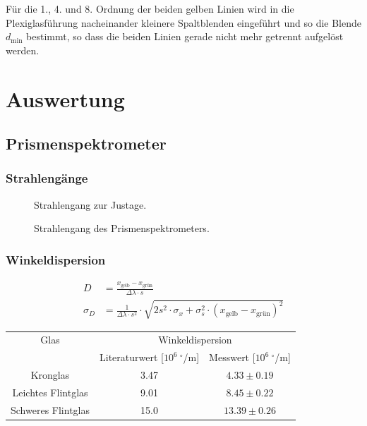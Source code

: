 \documentclass[12pt,a4paper,titlepage,headinclude,bibtotoc]{scrartcl}
\begin{document}
Für die 1., 4. und 8. Ordnung der beiden gelben Linien wird in die Plexiglasführung nacheinander kleinere Spaltblenden eingeführt und so die Blende $d_\text{min}$ bestimmt, so dass die beiden Linien gerade nicht mehr getrennt aufgelöst werden.

\section{Auswertung}
\label{sec:auswertung}

\subsection{Prismenspektrometer}
\subsubsection{Strahlengänge}
\begin{figure}[!htb]
	\def\svgwidth{0.8\linewidth}	
	
	\caption{Strahlengang zur Justage.}
\end{figure}


\begin{figure}[!htb]
	\def\svgwidth{0.8\linewidth}
	
	\caption{Strahlengang des Prismenspektrometers.}
\end{figure}

\subsubsection{Winkeldispersion}
\begin{align}
	D&=\frac{x_\text{gelb} - x_\text{grün}}{\Delta\lambda \cdot s}\\
\sigma_{D}&=\frac{1}{\Delta\lambda \cdot s^{2}} \cdot \sqrt{2s^{2} \cdot \sigma_{x} + \sigma_{s}^{2} \cdot \left(x_\text{gelb} - x_\text{grün}\right)^{2}}
\end{align}

\begin{table}[!htb]
	\centering
	\begin{tabular}{|c|c|c|}
		\hline
		Glas & \multicolumn{2}{c|}{Winkeldispersion}\\		
		 & Literaturwert [$10^6~^\circ$/m] & Messwert [$10^6~^\circ$/m]\\
		\hline
		Kronglas& 3.47 & $4.33 \pm 0.19$ \\
		Leichtes Flintglas & 9.01 & $8.45 \pm 0.22$ \\
		Schweres Flintglas & 15.0 & $13.39 \pm 0.26$ \\
		\hline
	\end{tabular}
	\label{tab:Dispersion}
\end{table}
\end{document}

